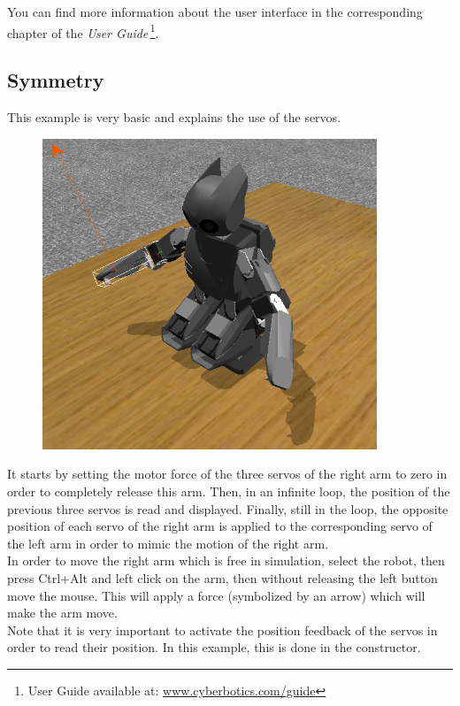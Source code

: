 \documentclass[a4paper, 12pt]{article}  		%
\begin{document}
You can find more information about the user interface in the corresponding chapter of the \textit{User Guide}\,\footnote{User Guide available at: \url{www.cyberbotics.com/guide}}.

\newpage
\subsection{Symmetry}

This example is very basic and explains the use of the servos.\\

\begin{figure}[H]
\begin{center}
\includegraphics[width=10cm]{example_symmetry.png}
\label{example_symmetry.png}
\end{center}
\end{figure}

It starts by setting the motor force of the three servos of the right arm to zero in order to completely release this arm.
Then, in an infinite loop, the position of the previous three servos is read and displayed.
Finally, still in the loop, the opposite position of each servo of the right arm is applied to the corresponding servo of the left arm in order to mimic the motion of the right arm.\\
In order to move the right arm which is free in simulation, select the robot, then press Ctrl+Alt and left click on the arm, then without releasing the left button move the mouse. This will apply a force (symbolized by an arrow) which will make the arm move.\\
Note that it is very important to activate the position feedback of the servos in order to read their position. In this example, this is done in the constructor.\\
\end{document}
